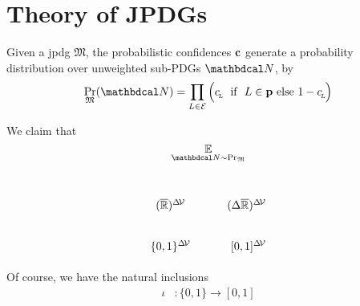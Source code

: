 \documentclass{article}
\begin{document}



\section{Theory of JPDGs}
Given a jpdg $\mathfrak M$, the probabilistic confidences $\mathbf{c}$ generate a probability distribution over unweighted sub-PDGs $\dg N$, by
\[ 
    \Pr_{\mathfrak M}( \dg N )  = \prod_{L \in \Ed}\Big( c\ssub L ~\text{ if }~ L \in \mat p  \text{ else }1 - c\ssub L \Big)
\]



We claim that
\[
    \Ex_{\dg N \sim \Pr_{\mathfrak M}}
\]



\begin{prop}
    
\end{prop}

\section{}

\[
    \begin{tikzcd}
        (\overline{\mathbb R})^{\Delta\!\V}
            & (\Delta \overline{\mathbb R})^{\Delta \!\V}
        \\  \{0,1\}^{\Delta\!\V}
            &\ [0,1]^{\Delta\!\V}
    \end{tikzcd}
\]

Of course, we have the natural inclusions 
\begin{align*}
    \iota &: \{0, 1\} \to [0,1] \\
\end{align*}
\end{document}
